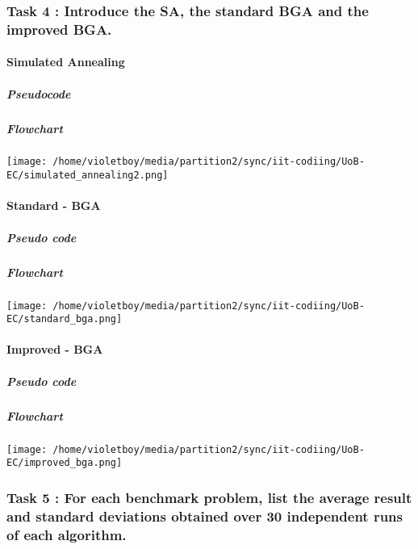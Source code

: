 \documentclass[
]{article}
\author{}
\date{}
\begin{document}
\tableofcontents

\subsubsection{Task 4 : Introduce the SA, the standard BGA and the
improved
BGA.}\label{task-4---introduce-the-sa-the-standard-bga-and-the-improved-bga}

\paragraph{Simulated Annealing}\label{simulated-annealing}

\subparagraph{\texorpdfstring{Pseudocode
}{Pseudocode }}\label{pseudocode}

\subparagraph{Flowchart}\label{flowchart}

\texttt{[image: /home/violetboy/media/partition2/sync/iit-codiing/UoB-EC/simulated\_annealing2.png]}

\paragraph{Standard - BGA}\label{standard---bga}

\subparagraph{Pseudo code}\label{pseudo-code}

\subparagraph{Flowchart}\label{flowchart-2}

\texttt{[image: /home/violetboy/media/partition2/sync/iit-codiing/UoB-EC/standard\_bga.png]}

\paragraph{Improved - BGA}\label{improved---bga}

\subparagraph{Pseudo code}\label{pseudo-code-2}

\subparagraph{Flowchart}\label{flowchart-3}

\texttt{[image: /home/violetboy/media/partition2/sync/iit-codiing/UoB-EC/improved\_bga.png]}

\subsubsection{Task 5 : For each benchmark problem, list the average
result and standard deviations obtained over 30 independent runs of each
algorithm.}\label{task-5--for-each-benchmark-problem-list-the-average-result-and-standard-deviations-obtained-over-30-independent-runs-of-each-algorithm}
\end{document}
